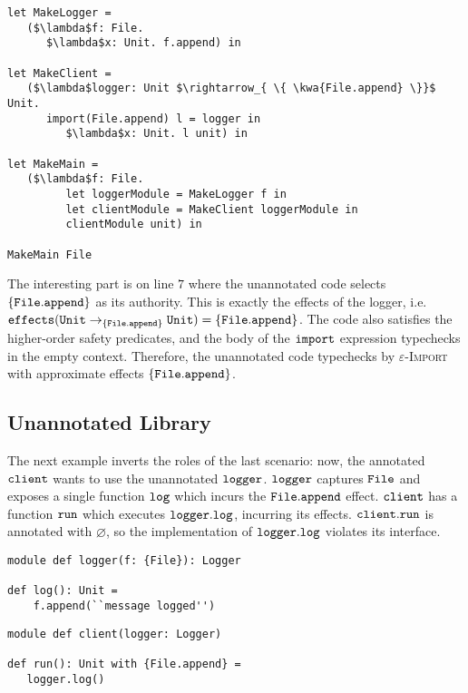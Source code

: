\begin{lstlisting}
let MakeLogger =
   ($\lambda$f: File.
      $\lambda$x: Unit. f.append) in
          
let MakeClient =
   ($\lambda$logger: Unit $\rightarrow_{ \{ \kwa{File.append} \}}$ Unit.
      import(File.append) l = logger in
         $\lambda$x: Unit. l unit) in
          
let MakeMain =
   ($\lambda$f: File.
         let loggerModule = MakeLogger f in
         let clientModule = MakeClient loggerModule in
         clientModule unit) in

MakeMain File
\end{lstlisting}

The interesting part  is on line $7$ where the unannotated code selects $\{ \mathtt{File.append} \}$ as its authority. This is exactly the effects of the logger, i.e. $\mathtt{effects}(\mathtt{Unit} \rightarrow_{\{\mathtt{File.append}\}} \mathtt{Unit}) = \{ \mathtt{File.append} \}$. The code also satisfies the higher-order safety predicates, and the body of the $\mathtt{import}$ expression typechecks in the empty context. Therefore, the unannotated code typechecks by \textsc{$\varepsilon$-Import} with approximate effects $\mathtt{\{ \mathtt{File.append} \}}$.

\subsection{Unannotated Library}

The next example inverts the roles of the last scenario: now, the annotated $\mathtt{client}$ wants to use the unannotated $\mathtt{logger}$. $\mathtt{logger}$ captures $\mathtt{File}$ and exposes a single function $\mathtt{log}$ which incurs the $\mathtt{File.append}$ effect. $\mathtt{client}$ has a function $\mathtt{run}$ which executes $\mathtt{logger.log}$, incurring its effects. $\mathtt{client.run}$ is annotated with $\varnothing$, so the implementation of $\mathtt{logger.log}$ violates its interface.

\begin{lstlisting}
module def logger(f: {File}): Logger

def log(): Unit =
    f.append(``message logged'')
\end{lstlisting}

\begin{lstlisting}
module def client(logger: Logger)

def run(): Unit with {File.append} =
   logger.log()
\end{lstlisting}

